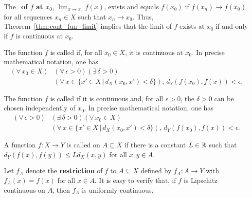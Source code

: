 \begin{definition}
\boldmath
The ~\textbf{of $f$ at $x_0$},
\unboldmath
$\lim_{x \to x_0} f(x)$, exists and equals $f(x_0)$ if $f(x_n) \to f(x_0)$ for all sequences $x_n \in X$ such that $x_n \to x_0$.
Thus, Theorem~\ref{thm:cont_fun_limit} implies that the limit of $f$ exists at $x_0$ if and only if $f$ is continuous at $x_0$.
\end{definition}

\begin{definition}
The function $f$ is called  if, for all $x_0 \in X$, it is continuous at $x_0$.
In precise mathematical notation, one has
\begin{equation*}
\begin{split}
(\forall \, x_0 \in X) & (\forall \, \epsilon >0) ( \exists \, \delta >0) \\ & (\forall \, x \in \{x'\in X\,|\,d_X (x_0,x')<\delta\}), \,
  d_Y \left( f(x_0),f(x) \right) < \epsilon .
\end{split}
\end{equation*}
\end{definition}

\begin{definition}
The function $f$ is called  if it is continuous and, for all $\epsilon > 0$, the $\delta >0$ can be chosen independently of $x_0$.
In precise mathematical notation, one has
\begin{equation*}
\begin{split}
(\forall \, \epsilon >0)  & ( \exists \, \delta >0) (\forall \, x_0 \in X) \\ & (\forall \, x \in \{x'\in X\,|\,d_X (x_0,x')<\delta\}), \,
  d_Y \left( f(x_0),f(x) \right) < \epsilon .
\end{split}
\end{equation*}
\end{definition}

\begin{definition}
A function $f  \colon X \rightarrow Y$ is called  on $A \subseteq X$ if there is a constant $L \in \mathbb{R}$ such that $d_Y (f(x),f(y)) \leq L d_X (x,y)$ for all $x,y\in A$.
\end{definition}

Let $f_A$ denote the \textbf{restriction} of $f$ to $A\subseteq X$ defined by $f_A \colon A \to Y$ with $f_A (x) = f(x)$ for all $x\in A$.
It is easy to verify that, if $f$ is Lipschitz continuous on $A$, then $f_A$ is uniformly continuous.


